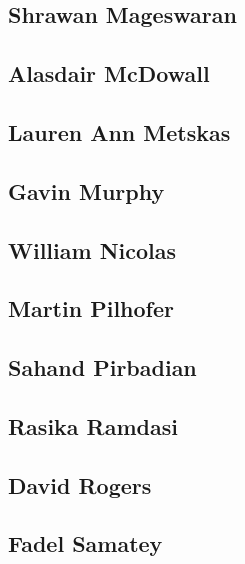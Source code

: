 \documentclass[]{tufte-book}
\begin{document}
\hypertarget{shrawan_mageswaran}{%
\subsection{Shrawan Mageswaran}\label{shrawan_mageswaran}}

\hypertarget{alasdair_mcdowall}{%
\subsection{Alasdair McDowall}\label{alasdair_mcdowall}}

\hypertarget{lauren_ann_metskas}{%
\subsection{Lauren Ann Metskas}\label{lauren_ann_metskas}}

\hypertarget{gavin_murphy}{%
\subsection{Gavin Murphy}\label{gavin_murphy}}

\hypertarget{william_nicolas}{%
\subsection{William Nicolas}\label{william_nicolas}}

\hypertarget{martin_pilhofer}{%
\subsection{Martin Pilhofer}\label{martin_pilhofer}}

\hypertarget{sahand_pirbadian}{%
\subsection{Sahand Pirbadian}\label{sahand_pirbadian}}

\hypertarget{rasika_ramdasi}{%
\subsection{Rasika Ramdasi}\label{rasika_ramdasi}}

\hypertarget{david_rogers}{%
\subsection{David Rogers}\label{david_rogers}}

\hypertarget{fadel_samatey}{%
\subsection{Fadel Samatey}\label{fadel_samatey}}
\end{document}
